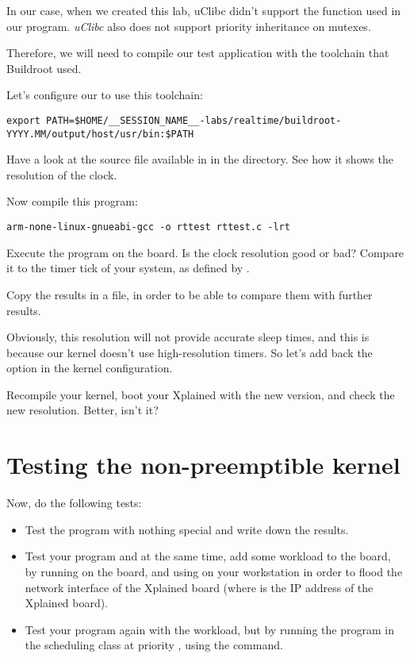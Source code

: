 In our case, when we created this lab, uClibc didn't support the
 function used in our 
program. {\em uClibc} also does not support priority inheritance on
mutexes.

Therefore, we will need to compile our test application with the
toolchain that Buildroot used.

Let's configure our  to use this toolchain:

\scriptsize
\begin{verbatim}
export PATH=$HOME/__SESSION_NAME__-labs/realtime/buildroot-YYYY.MM/output/host/usr/bin:$PATH
\end{verbatim}
\normalsize

Have a look at the  source file available in
 in the  directory. See how it shows the
resolution of the  clock.

Now compile this program:
\begin{verbatim}
arm-none-linux-gnueabi-gcc -o rttest rttest.c -lrt
\end{verbatim}

Execute the program on the board. Is the clock resolution good or bad?
Compare it to the timer tick of your system, as defined by
.

Copy the results in a file, in order to be able to compare them
with further results.

Obviously, this resolution will not provide accurate sleep times, and
this is because our kernel doesn't use high-resolution timers. So
let's add back the  option in the kernel
configuration.

Recompile your kernel, boot your Xplained with the new version, and
check the new resolution. Better, isn't it?

\section{Testing the non-preemptible kernel}

Now, do the following tests:
\begin{itemize}
\item Test the program with nothing special and write down the
  results.
\item Test your program and at the same time, add some workload to the
  board, by running  on the
  board, and using  on your
  workstation in order to flood the network interface of the Xplained
  board (where  is the IP address of the Xplained
  board).
\item Test your program again with the workload, but by running the
  program in the  scheduling class at priority
  , using the  command.
\end{itemize}

